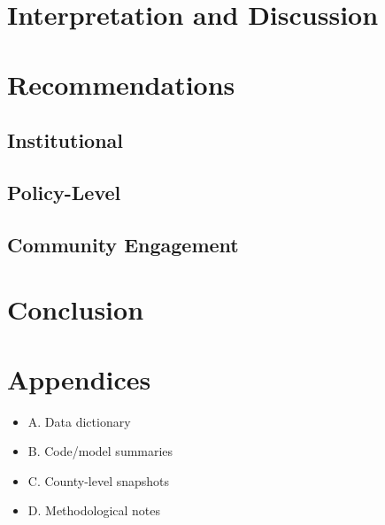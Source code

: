 \documentclass[12pt]{llncs}
\begin{document}
\section{Interpretation and Discussion}


\section{Recommendations}
\subsection{Institutional}

\subsection{Policy-Level}

\subsection{Community Engagement}


\section{Conclusion}


\section{Appendices}
\begin{itemize}
  \item A. Data dictionary
  \item B. Code/model summaries
  \item C. County-level snapshots
  \item D. Methodological notes
\end{itemize}
\end{document}
